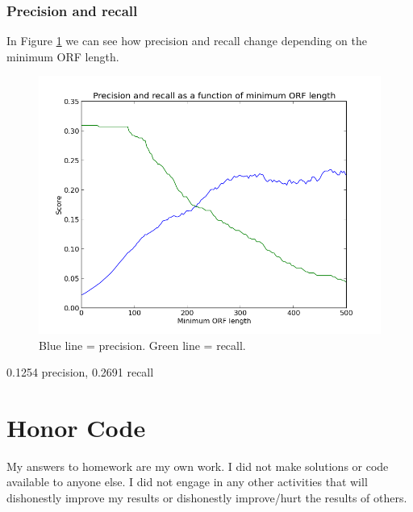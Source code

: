\documentclass[a4paper,11pt]{article}
\begin{document}
\subsubsection{Precision and recall}
In Figure \ref{precrec2} we can see how precision and recall change depending on the minimum ORF length.
\begin{figure}[h!]
\begin{center}
\includegraphics[scale=0.65]{precision-recall2.png}
\caption{Blue line = precision. Green line = recall.}
\label{precrec2}
\end{center}
\end{figure}
0.1254 precision, 0.2691 recall 

\section*{Honor Code}


My answers to homework are my own work. I did not make solutions or code available to anyone else. I did not engage in any other activities that will dishonestly improve my results or dishonestly improve/hurt the results of others.
\end{document}
